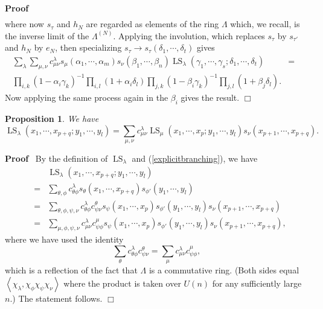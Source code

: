 \documentclass[11pt]{amsart}
\newcommand{\tmop}[1]{\ensuremath{\operatorname{#1}}}
\newtheorem{proposition}{Proposition}
\renewenvironment{proof}{
\noindent\textbf{Proof}\ }{\hspace*{\fill}
\begin{math}\Box\end{math}\medskip}
\begin{document}
\begin{proof}
\begin{eqnarray*}
\end{eqnarray*}
where now $s_{\tau}$ and $h_N$ are regarded as elements of the
ring $\Lambda$ which, we recall, is the inverse limit of the
$\Lambda^{( N )}$. Applying the involution, which replaces
$s_{\tau}$ by $s_{\tau'}$ and $h_N$ by $e_N$, then specializing
$s_{\tau} \longrightarrow s_{\tau} ( \delta_1, \cdots, \delta_t )$
gives
\begin{eqnarray*}
   \sum_{\lambda} \sum_{\mu, \nu} c_{\mu \nu}^{\lambda} s_{\mu} ( \alpha_1,
   \cdots, \alpha_m ) s_{\nu} ( \beta_1, \cdots, \beta_n )
   \tmop{LS}_{\lambda} ( \gamma_1, \cdots, \gamma_s ; \delta_1, \cdots,
   \delta_t ) & = & \\
   \prod_{i, k} ( 1 - \alpha_i \gamma_k )^{- 1} \prod_{i, l} ( 1 + \alpha_i
   \delta_l ) \prod_{j, k} ( 1 - \beta_i \gamma_k )^{- 1} \prod_{j, l} ( 1 +
   \beta_j \delta_l ) . &  &
\end{eqnarray*}
Now applying the same process again in the $\beta_i$ gives the
result.
\end{proof}


\begin{proposition}
\label{genlwr}We have
\[ \tmop{LS}_{\lambda} ( x_1, \cdots, x_{p + q} ; y_1, \cdots, y_l ) =
    \sum_{\mu, \nu} c^{\lambda}_{\mu \nu} \tmop{LS}_{\mu} ( x_1, \cdots, x_p
    ; y_1, \cdots, y_l ) s_{\nu} ( x_{p + 1}, \cdots, x_{p + q} ) . \]
\end{proposition}

\begin{proof}
By the definition of $\tmop{LS}_{\lambda}$ and
(\ref{explicitbranching}), we have
\begin{eqnarray*}
   &  & \tmop{LS}_{\lambda} ( x_1, \cdots, x_{p + q} ; y_1, \cdots, y_l )\\
   & = & \sum_{\theta, \phi} c^{\lambda}_{\theta \phi} s_{\theta} ( x_1,
   \cdots, x_{p + q} ) s_{\phi'} ( y_1, \cdots, y_l )\\
   & = & \sum_{\theta, \phi, \psi, \nu} c^{\lambda}_{\theta \phi}
   c^{\theta}_{\psi \nu} s_{\psi} ( x_1, \cdots, x_p ) s_{\phi'} ( y_1,
   \cdots, y_l ) s_{\nu} ( x_{p + 1}, \cdots, x_{p + q} )\\
   & = & \sum_{\mu, \phi, \psi, \nu} c^{\lambda}_{\mu \nu} c^{\mu}_{\psi
   \phi} s_{\psi} ( x_1, \cdots, x_p ) s_{\phi'} ( y_1, \cdots, y_l ) s_{\nu}
   ( x_{p + 1}, \cdots, x_{p + q} ),
\end{eqnarray*}
where we have used the identity
\[ \sum_{\theta} c^{\lambda}_{\theta \phi} c^{\theta}_{\psi \nu} =
    \sum_{\mu} c^{\lambda}_{\mu \nu} c^{\mu}_{\psi \phi}, \]
which is a reflection of the fact that $\Lambda$ is a commutative
ring. (Both sides equal $\left\langle \chi_{\lambda}, \chi_{\phi}
\chi_{\psi} \chi_{\nu} \right\rangle$ where the product is taken
over $U ( n )$ for any sufficiently large $n$.) The statement
follows.
\end{proof}
\end{document}
